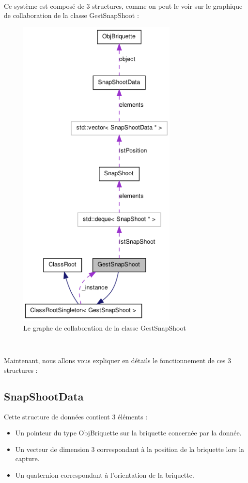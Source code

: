 \documentclass[frenchb,twoside]{EPURapport}
\begin{document}
		\
		
		Ce système est composé de 3 structures, comme on peut le voir
		 sur le graphique de collaboration de la classe GestSnapShoot :
		\begin{figure}[h]
			\centering
			\includegraphics[width=8cm]{images/graph_collaboration_gestsnapshoot.png}
			\caption{\label{fig:graph_collaboration_gestsnapshoot}Le graphe de collaboration de la classe GestSnapShoot}
		\end{figure}
		
		\
		
		Maintenant, nous allons vous expliquer en détails le fonctionnement de
		ces 3 structures :
		
		\subsection{SnapShootData}

		Cette structure de données contient 3 éléments :
		\begin{itemize}
		\item Un pointeur du type ObjBriquette sur la briquette concernée par la donnée.
		\item Un vecteur de dimension 3 correspondant à la position de la briquette lors
		la capture.
		\item Un quaternion correspondant à l'orientation de la briquette.
		\end{itemize}
\end{document}
